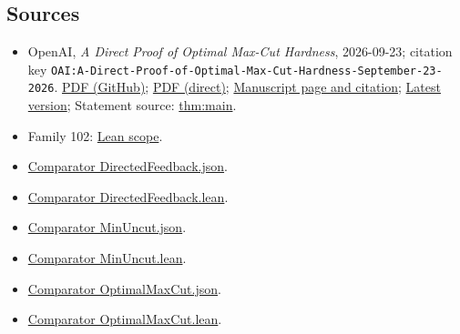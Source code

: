 \documentclass[11pt]{article}
\begin{document}
\subsection{Sources}
\begin{itemize}
\item OpenAI, \emph{A Direct Proof of Optimal Max-Cut Hardness}, 2026-09-23; citation key \texttt{OAI:A-Direct-Proof-of-Optimal-Max-Cut-Hardness-September-23-2026}. \href{https://github.com/openai/math/blob/adc7f1241b42e322a6451854ab7e4b4c146bf78a/preprints/A-Direct-Proof-of-Optimal-Max-Cut-Hardness-September-23-2026/paper.pdf}{PDF (GitHub)}; \href{https://github.com/openai/math/raw/adc7f1241b42e322a6451854ab7e4b4c146bf78a/preprints/A-Direct-Proof-of-Optimal-Max-Cut-Hardness-September-23-2026/paper.pdf}{PDF (direct)}; \href{https://github.com/openai/math/blob/adc7f1241b42e322a6451854ab7e4b4c146bf78a/preprints/A-Direct-Proof-of-Optimal-Max-Cut-Hardness-September-23-2026/README.md}{Manuscript page and citation}; \href{https://github.com/openai/math/blob/main/preprints/A-Direct-Proof-of-Optimal-Max-Cut-Hardness-September-23-2026/paper.pdf}{Latest version}; Statement source: \href{https://github.com/openai/math/blob/adc7f1241b42e322a6451854ab7e4b4c146bf78a/preprints/A-Direct-Proof-of-Optimal-Max-Cut-Hardness-September-23-2026/build/sections/introduction.tex\#L39}{thm:main}.
\item Family 102: \href{https://github.com/openai/math/blob/adc7f1241b42e322a6451854ab7e4b4c146bf78a/lean/docs/102.md}{Lean scope}.
\item \href{https://github.com/openai/math/blob/adc7f1241b42e322a6451854ab7e4b4c146bf78a/lean/ComparatorChallenges/DirectedFeedback.json}{Comparator DirectedFeedback.json}.
\item \href{https://github.com/openai/math/blob/adc7f1241b42e322a6451854ab7e4b4c146bf78a/lean/ComparatorChallenges/DirectedFeedback.lean}{Comparator DirectedFeedback.lean}.
\item \href{https://github.com/openai/math/blob/adc7f1241b42e322a6451854ab7e4b4c146bf78a/lean/ComparatorChallenges/MinUncut.json}{Comparator MinUncut.json}.
\item \href{https://github.com/openai/math/blob/adc7f1241b42e322a6451854ab7e4b4c146bf78a/lean/ComparatorChallenges/MinUncut.lean}{Comparator MinUncut.lean}.
\item \href{https://github.com/openai/math/blob/adc7f1241b42e322a6451854ab7e4b4c146bf78a/lean/ComparatorChallenges/OptimalMaxCut.json}{Comparator OptimalMaxCut.json}.
\item \href{https://github.com/openai/math/blob/adc7f1241b42e322a6451854ab7e4b4c146bf78a/lean/ComparatorChallenges/OptimalMaxCut.lean}{Comparator OptimalMaxCut.lean}.

\end{itemize}
\end{document}
